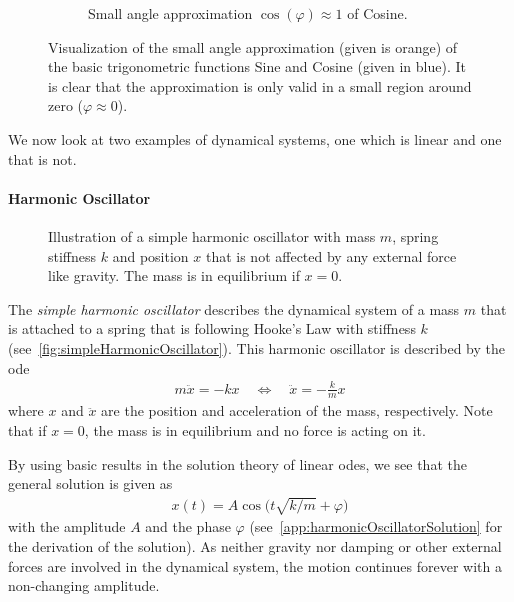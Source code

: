 \begin{figure}
\begin{subfigure}[t]{0.5\linewidth}
				\caption{Small angle approximation \( \cos(\varphi) \approx 1 \) of Cosine.}
			\end{subfigure}
			\caption{Visualization of the small angle approximation (given is orange) of the basic trigonometric functions Sine and Cosine (given in blue). It is clear that the approximation is only valid in a small region around zero (\( \varphi \approx 0 \)).}
			\label{fig:smallAngleApproximation}
		\end{figure}

		We now look at two examples of dynamical systems, one which is linear and one that is not.

		\paragraph{Harmonic Oscillator}
			\label{subsec:harmonicOscillator}

			\begin{figure}
				\centering
				\tikzHarmonicOscillator
				\caption{Illustration of a simple harmonic oscillator with mass \(m\), spring stiffness \(k\) and position \(x\) that is not affected by any external force like gravity. The mass is in equilibrium if \( x = 0 \).}
				\label{fig:simpleHarmonicOscillator}
			\end{figure}

			The \emph{simple harmonic oscillator} describes the dynamical system of a mass \(m\) that is attached to a spring that is following Hooke's Law with stiffness \(k\) (see~\autoref{fig:simpleHarmonicOscillator}). This harmonic oscillator is described by the \ac{ode}
			\begin{align}
				m\ddot{x} = -kx \quad\iff\quad \ddot{x} = -\frac{k}{m} x  \label{eq:harmonicOscillator}
			\end{align}
			where \(x\) and \(\ddot{x}\) are the position and acceleration of the mass, respectively. Note that if \( x = 0 \), the mass is in equilibrium and no force is acting on it.

			By using basic results in the solution theory of linear \acp{ode}, we see that the general solution is given as
			\begin{align*}
				x(t) = A \cos\Big(t \sqrt{k / m} + \varphi\Big)
			\end{align*}
			with the amplitude \(A\) and the phase \(\varphi\) (see~\autoref{app:harmonicOscillatorSolution} for the derivation of the solution). As neither gravity nor damping or other external forces are involved in the dynamical system, the motion continues forever with a non-changing amplitude.

